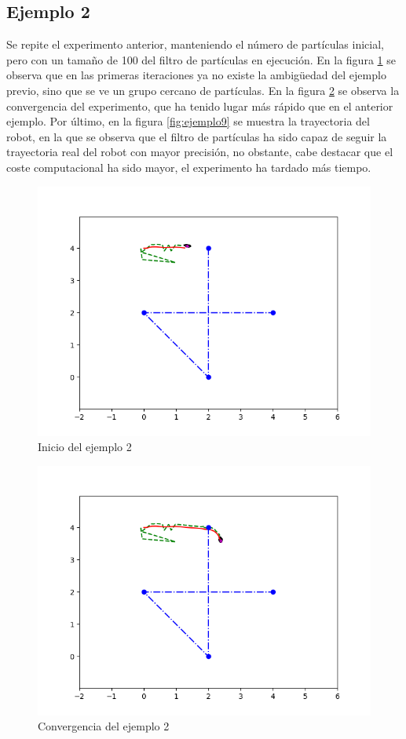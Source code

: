 \subsection{Ejemplo 2}
Se repite el experimento anterior, manteniendo el número de partículas inicial, pero con un tamaño de 100 del filtro de partículas en ejecución. En la figura \ref{fig:ejemplo7} se observa que en las primeras iteraciones ya no existe la 
ambigüedad del ejemplo previo, sino que se ve un grupo cercano de partículas. En la figura \ref{fig:ejemplo8} se observa la convergencia del experimento, que ha tenido lugar más rápido que en el anterior ejemplo. Por último, en la figura \ref{fig:ejemplo9} se muestra la trayectoria del robot, en la que se observa que el filtro de partículas ha sido capaz de seguir la trayectoria real del robot con mayor precisión, no obstante, 
cabe destacar que el coste computacional ha sido mayor, el experimento ha tardado más tiempo.
\begin{figure}[htb]
  \centering
  \includegraphics[width=.8\linewidth]{images/filtro7.png}
  \caption{Inicio del ejemplo 2}
  \label{fig:ejemplo7}
\end{figure}
\begin{figure}[htb]
  \centering
  \includegraphics[width=.8\linewidth]{images/filtro8.png}
  \caption{Convergencia del ejemplo 2}
  \label{fig:ejemplo8}
\end{figure}

